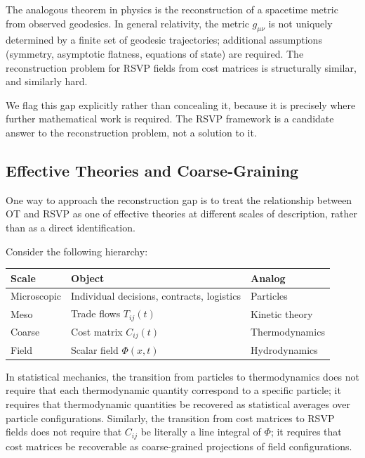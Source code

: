 \documentclass[12pt]{article}
\begin{document}
The analogous theorem in physics is the reconstruction of a spacetime metric from observed geodesics. In general relativity, the metric $g_{\mu\nu}$ is not uniquely determined by a finite set of geodesic trajectories; additional assumptions (symmetry, asymptotic flatness, equations of state) are required. The reconstruction problem for RSVP fields from cost matrices is structurally similar, and similarly hard.

We flag this gap explicitly rather than concealing it, because it is precisely where further mathematical work is required. The RSVP framework is a candidate answer to the reconstruction problem, not a solution to it.

\subsection{Effective Theories and Coarse-Graining}

One way to approach the reconstruction gap is to treat the relationship between OT and RSVP as one of effective theories at different scales of description, rather than as a direct identification.

Consider the following hierarchy:

\begin{center}
\renewcommand{\arraystretch}{1.4}
\begin{tabular}{l l l}
\toprule
\textbf{Scale} & \textbf{Object} & \textbf{Analog} \\
\midrule
Microscopic & Individual decisions, contracts, logistics & Particles \\
Meso & Trade flows $T_{ij}(t)$ & Kinetic theory \\
Coarse & Cost matrix $C_{ij}(t)$ & Thermodynamics \\
Field & Scalar field $\Phi(x,t)$ & Hydrodynamics \\
\bottomrule
\end{tabular}
\end{center}

In statistical mechanics, the transition from particles to thermodynamics does not require that each thermodynamic quantity correspond to a specific particle; it requires that thermodynamic quantities be recovered as statistical averages over particle configurations. Similarly, the transition from cost matrices to RSVP fields does not require that $C_{ij}$ be literally a line integral of $\Phi$; it requires that cost matrices be recoverable as coarse-grained projections of field configurations.
\end{document}
